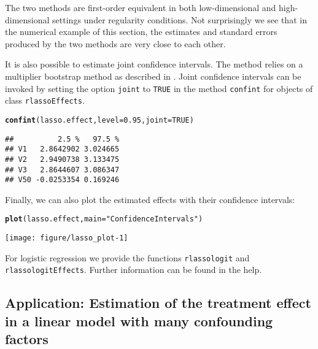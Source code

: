 \documentclass{amsart}\usepackage[]{graphicx}\usepackage[]{color}
\makeatletter
\newcommand{\hlnum}[1]{\textcolor[rgb]{0.686,0.059,0.569}{#1}}%
\newcommand{\hlstr}[1]{\textcolor[rgb]{0.192,0.494,0.8}{#1}}%
\newcommand{\hlstd}[1]{\textcolor[rgb]{0.345,0.345,0.345}{#1}}%
\newcommand{\hlkwc}[1]{\textcolor[rgb]{0.333,0.667,0.333}{#1}}%
\newcommand{\hlkwd}[1]{\textcolor[rgb]{0.737,0.353,0.396}{\textbf{#1}}}%
\newenvironment{kframe}{%
 \def\at@end@of@kframe{}%
 \ifinner\ifhmode%
  \def\at@end@of@kframe{\end{minipage}}%
  \begin{minipage}{\columnwidth}%
 \fi\fi%
 \def\FrameCommand##1{\hskip\@totalleftmargin \hskip-\fboxsep
 \colorbox{shadecolor}{##1}\hskip-\fboxsep
     \hskip-\linewidth \hskip-\@totalleftmargin \hskip\columnwidth}%
 \MakeFramed {\advance\hsize-\width
   \@totalleftmargin\z@ \linewidth\hsize
   \@setminipage}}%
 {\par\unskip\endMakeFramed%
 \at@end@of@kframe}
\newenvironment{knitrout}{}{} %
\newcommand{\code}[1]{\texttt{#1}}
\makeatother
\begin{document}
The two methods are first-order equivalent in both low-dimensional and high-dimensional settings under regularity conditions.  Not surprisingly we see that in the numerical example of this section, the estimates and standard errors produced by the two methods are very close to each other.  

It is also possible to estimate joint confidence intervals. The method relies on a multiplier bootstrap method as described in \cite{BCK2014}. Joint confidence intervals can be invoked by setting the option \code{joint} to \code{TRUE} in the method \code{confint} for objects of class \code{rlassoEffects}.

\begin{knitrout}
\color{fgcolor}\begin{kframe}
\begin{alltt}
\hlkwd{confint}\hlstd{(lasso.effect,} \hlkwc{level}\hlstd{=}\hlnum{0.95}\hlstd{,} \hlkwc{joint}\hlstd{=}\hlnum{TRUE}\hlstd{)}
\end{alltt}
\begin{verbatim}
##          2.5 %   97.5 %
## V1   2.8642902 3.024665
## V2   2.9490738 3.133475
## V3   2.8644607 3.086347
## V50 -0.0253354 0.169246
\end{verbatim}
\end{kframe}
\end{knitrout}

Finally, we can also plot the estimated effects with their confidence intervals:
\begin{knitrout}
\color{fgcolor}\begin{kframe}
\begin{alltt}
\hlkwd{plot}\hlstd{(lasso.effect,} \hlkwc{main}\hlstd{=}\hlstr{"Confidence Intervals"}\hlstd{)}
\end{alltt}
\end{kframe}

{\centering \texttt{[image: figure/lasso\_plot-1]} 

}



\end{knitrout}

For logistic regression we provide the functions \code{rlassologit} and \code{rlassologitEffects}. Further information can be found in the help.

\subsection{Application: Estimation of the treatment effect in a linear model with many confounding factors}
\end{document}
